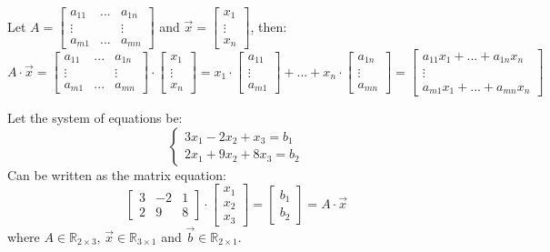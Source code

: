 \begin{eg}
    Let $A = \begin{bmatrix}a_{11} & ... & a_{1n} \\ \vdots &  & \vdots \\ a_{m1} & ... & a_{mn} \end{bmatrix}$ and $\vec{x} = \begin{bmatrix} x_1 \\ \vdots \\ x_n \end{bmatrix}$, then:
    \[
        A \cdot \vec{x} = \begin{bmatrix}a_{11} & ... & a_{1n} \\ \vdots &  & \vdots \\ a_{m1} & ... & a_{mn} \end{bmatrix} \cdot \begin{bmatrix} x_1 \\ \vdots \\ x_n \end{bmatrix} = x_1 \cdot \begin{bmatrix} a_{11} \\ \vdots \\ a_{m1} \end{bmatrix} + ... + x_n \cdot \begin{bmatrix} a_{1n} \\ \vdots \\ a_{mn} \end{bmatrix} = \begin{bmatrix} a_{11}x_1 + ... + a_{1n}x_n \\ \vdots \\ a_{m1}x_1 + ... + a_{mn}x_n \end{bmatrix}
    \]
\end{eg}

\begin{eg}
    Let the system of equations be:
    \[
        \begin{cases}
            3x_1 - 2x_2 + x_3 = b_1 \\
            2x_1 + 9x_2 + 8x_3 = b_2
        \end{cases}
    \]
    Can be written as the matrix equation:
    \[
        \begin{bmatrix}3 & -2 & 1 \\ 2 & 9 & 8\end{bmatrix} \cdot \begin{bmatrix} x_1 \\ x_2 \\ x_3 \end{bmatrix} = \begin{bmatrix} b_1 \\ b_2 \end{bmatrix} = A \cdot \vec{x}
    \]
    where $A \in \mathbb{R}_{2 \times 3}$, $\vec{x} \in \mathbb{R}_{3 \times 1}$ and $\vec{b} \in \mathbb{R}_{2 \times 1}$.
\end{eg}

